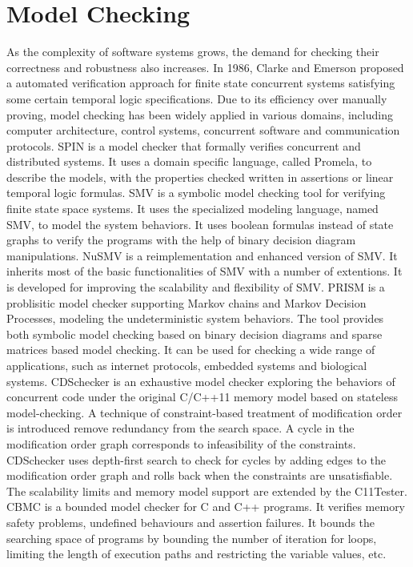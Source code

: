 \section{Model Checking}

As the complexity of software systems grows, the demand for checking their correctness and robustness also increases. In 1986, Clarke and Emerson \cite{mc:Clarke} proposed a automated verification approach for finite state concurrent systems satisfying some certain temporal logic specifications. Due to its efficiency over manually proving, model checking has been widely applied in various domains, including computer architecture, control systems, concurrent software and communication protocols. 
SPIN\cite{mc:spin} is a model checker that formally verifies concurrent and distributed systems. It uses a domain specific language, called Promela, to describe the models, with the properties checked written in assertions or linear temporal logic formulas. 
SMV\cite{mc:smv} is a symbolic model checking tool for verifying finite state space systems. It uses the specialized modeling language, named SMV, to model the system behaviors. It uses boolean formulas instead of state graphs to verify the programs with the help of binary decision diagram manipulations. 
NuSMV\cite{mc:NuSMV} is a reimplementation and enhanced version of SMV. It inherits most of the basic functionalities of SMV with a number of extentions. It is developed for improving the scalability and flexibility of SMV.
PRISM\cite{mc:PRISM} is a problisitic model checker supporting Markov chains and Markov Decision Processes, modeling the undeterministic system behaviors. The tool provides both symbolic model checking based on binary decision diagrams and sparse matrices based model checking. It can be used for checking a wide range of applications, such as internet protocols, embedded systems and biological systems. 
CDSchecker\cite{cdschecker} is an exhaustive model checker exploring the behaviors of concurrent code under the original C/C++11 memory model based on stateless model-checking. A technique of constraint-based treatment of modification order is introduced remove redundancy from the search space. A cycle in the modification order graph corresponds to infeasibility of the constraints. CDSchecker uses depth-first search to check for cycles by adding edges to the modification order graph and rolls back when the constraints are unsatisfiable. The scalability limits and memory model support are extended by the C11Tester. 
CBMC\cite{mc:CBMC} is a bounded model checker for C and C++ programs. It verifies memory safety problems, undefined behaviours and assertion failures. It bounds the searching space of programs by bounding the number of iteration for loops, limiting the length of execution paths and restricting the variable values, etc. 
